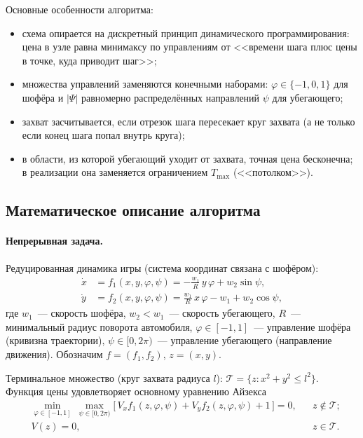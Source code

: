 \documentclass[14pt,a4paper]{extarticle}
\newcommand{\Tmax}{T_{\max}}
\begin{document}
Основные особенности алгоритма:
\begin{itemize}
	\item схема опирается на дискретный принцип динамического
	программирования: цена в узле равна минимаксу по управлениям от
	<<времени шага плюс цены в точке, куда приводит шаг>>;
	\item множества управлений заменяются конечными наборами:
	$\varphi\in\{-1,0,1\}$ для шофёра и $|\Psi|$ равномерно
	распределённых направлений $\psi$ для убегающего;
	\item захват засчитывается, если отрезок шага пересекает круг
	захвата (а не только если конец шага попал внутрь круга);
	\item в области, из которой убегающий уходит от захвата, точная цена
	бесконечна; в реализации она заменяется ограничением $\Tmax$
	(<<потолком>>).
\end{itemize}

\subsection{Математическое описание алгоритма}

\paragraph{Непрерывная задача.}
Редуцированная динамика игры (система координат связана с шофёром):
\begin{equation}\label{eq:dyn}
	\begin{aligned}
		\dot x &= f_1(x,y,\varphi,\psi) = -\frac{w_1}{R}\,y\,\varphi + w_2\sin\psi,\\
		\dot y &= f_2(x,y,\varphi,\psi) = \frac{w_1}{R}\,x\,\varphi - w_1 + w_2\cos\psi,
	\end{aligned}
\end{equation}
где $w_1$~--- скорость шофёра, $w_2<w_1$~--- скорость убегающего,
$R$~--- минимальный радиус поворота автомобиля,
$\varphi\in[-1,1]$~--- управление шофёра (кривизна траектории),
$\psi\in[0,2\pi)$~--- управление убегающего (направление движения).
Обозначим $f=(f_1,f_2)$, $z=(x,y)$.

Терминальное множество (круг захвата радиуса $l$):
$\mathcal{T} = \{ z : x^2+y^2 \le l^2 \}$.
Функция цены удовлетворяет основному уравнению Айзекса
\begin{equation}\label{eq:hji}
	\begin{aligned}
		&\min_{\varphi\in[-1,1]}\ \max_{\psi\in[0,2\pi)}
		\bigl[\, V_x f_1(z,\varphi,\psi) + V_y f_2(z,\varphi,\psi) + 1 \,\bigr] = 0,
		&& z\notin\mathcal{T};\\
		&V(z)=0, && z\in\mathcal{T}.
	\end{aligned}
\end{equation}
\end{document}
